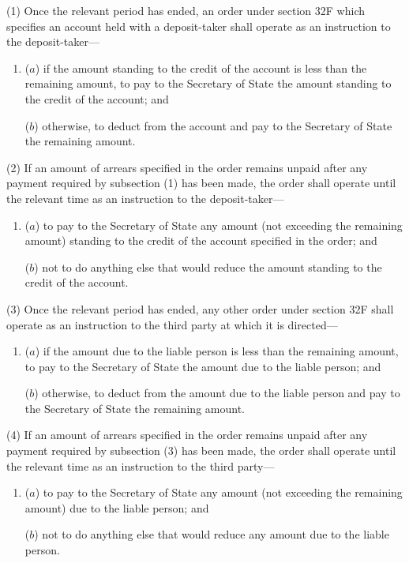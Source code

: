 \documentclass[12pt,a4paper]{article}
\begin{document}
(1) Once the relevant period has ended, an order under section 32F which specifies an account held with a deposit-taker shall operate as an instruction to the deposit-taker---
\begin{enumerate}\item[]
($a$) if the amount standing to the credit of the account is less than the remaining amount, to pay to the Secretary of State the amount standing to the credit of the account; and

($b$) otherwise, to deduct from the account and pay to the Secretary of State the remaining amount.
\end{enumerate}

(2) If an amount of arrears specified in the order remains unpaid after any payment required by subsection (1) has been made, the order shall operate until the relevant time as an instruction to the deposit-taker---
\begin{enumerate}\item[]
($a$) to pay to the Secretary of State any amount (not exceeding the remaining
amount) standing to the credit of the account specified in the order; and

($b$) not to do anything else that would reduce the amount standing to the credit
of the account.
\end{enumerate}

(3) Once the relevant period has ended, any other order under section 32F shall
operate as an instruction to the third party at which it is directed---
\begin{enumerate}\item[]
($a$) if the amount due to the liable person is less than the remaining amount, to
pay to the Secretary of State the amount due to the liable person; and

($b$) otherwise, to deduct from the amount due to the liable person and pay to the
Secretary of State the remaining amount.
\end{enumerate}

(4) If an amount of arrears specified in the order remains unpaid after any payment
required by subsection (3) has been made, the order shall operate until the relevant
time as an instruction to the third party---
\begin{enumerate}\item[]
($a$) to pay to the Secretary of State any amount (not exceeding the remaining
amount) due to the liable person; and

($b$) not to do anything else that would reduce any amount due to the liable
person.
\end{enumerate}
\end{document}
